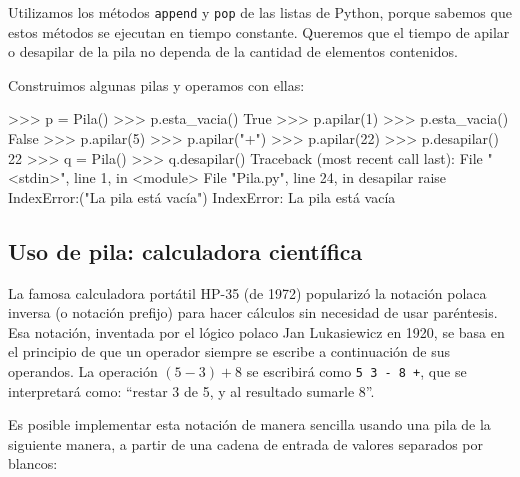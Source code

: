 \begin{observacion}
Utilizamos los métodos \lstinline!append! y \lstinline!pop! de las listas de
Python, porque sabemos que estos métodos se ejecutan en tiempo constante.
Queremos que el tiempo de apilar o desapilar de la pila no dependa de la
cantidad de elementos contenidos.
\end{observacion}

Construimos algunas pilas y operamos con ellas:

\begin{codigo-python-sn}
>>> p = Pila()
>>> p.esta_vacia()
True
>>> p.apilar(1)
>>> p.esta_vacia()
False
>>> p.apilar(5)
>>> p.apilar("+")
>>> p.apilar(22)
>>> p.desapilar()
22
>>> q = Pila()
>>> q.desapilar()
Traceback (most recent call last):
  File "<stdin>", line 1, in <module>
  File "Pila.py", line 24, in desapilar
    raise IndexError:("La pila está vacía")
IndexError: La pila está vacía
\end{codigo-python-sn}

\subsection{Uso de pila: calculadora científica}

La famosa calculadora portátil HP-35 (de 1972) popularizó la notación
polaca inversa (o notación prefijo) para hacer cálculos sin necesidad de
usar paréntesis. Esa notación, inventada por el lógico polaco Jan
Lukasiewicz en 1920, se basa en el principio de que un operador siempre se
escribe a continuación de sus operandos. La operación $(5-3)+8$ se
escribirá como \lstinline|5 3 - 8 +|, que se interpretará como: ``restar 3
de 5, y al resultado sumarle 8''.

Es posible implementar esta notación de manera sencilla usando una pila de
la siguiente manera, a partir de una cadena de entrada de valores separados
por blancos:

